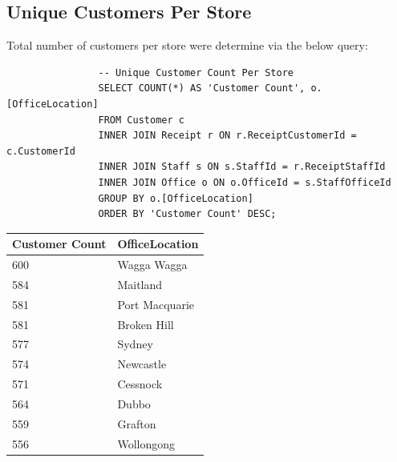\documentclass{article}
\begin{document}
\newpage

            \subsection{Unique Customers Per Store}
                
            Total number of customers per store were determine via the below query: \\

            \begin{lstlisting}
                -- Unique Customer Count Per Store
                SELECT COUNT(*) AS 'Customer Count', o.[OfficeLocation]
                FROM Customer c
                INNER JOIN Receipt r ON r.ReceiptCustomerId = c.CustomerId
                INNER JOIN Staff s ON s.StaffId = r.ReceiptStaffId
                INNER JOIN Office o ON o.OfficeId = s.StaffOfficeId
                GROUP BY o.[OfficeLocation]
                ORDER BY 'Customer Count' DESC;
            \end{lstlisting}

            \begin{table}[H]
                \centering
                \begin{tabular}{|l|l|}
                \hline
                Customer Count & OfficeLocation \\ \hline
                600            & Wagga Wagga    \\ \hline
                584            & Maitland       \\ \hline
                581            & Port Macquarie \\ \hline
                581            & Broken Hill    \\ \hline
                577            & Sydney         \\ \hline
                574            & Newcastle      \\ \hline
                571            & Cessnock       \\ \hline
                564            & Dubbo          \\ \hline
                559            & Grafton        \\ \hline
                556            & Wollongong     \\ \hline
                \end{tabular}
            \end{table}
\end{document}
